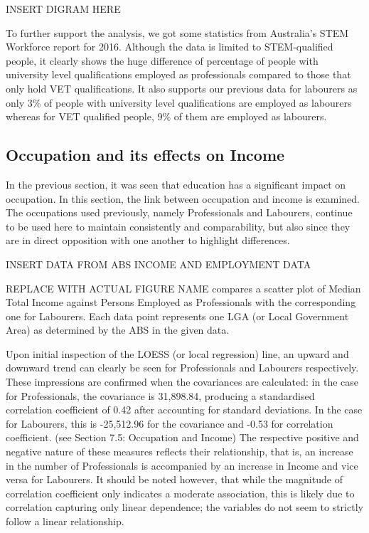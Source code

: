 \documentclass[12pt,a4paper]{article}
\begin{document}
	INSERT DIGRAM HERE
	
	To further support the analysis, we got some statistics from Australia’s STEM Workforce report for 2016. Although the data is limited to STEM-qualified people, it clearly shows the huge difference of percentage of people with university level qualifications employed as professionals compared to those that only hold VET qualifications. It also supports our previous data for labourers as only 3\% of people with university level qualifications are employed as labourers whereas for VET qualified people, 9\% of them are employed as labourers.
	
	
	\subsection{Occupation and its effects on Income}
	In the previous section, it was seen that education has a significant impact on occupation. In this section, the link between occupation and income is examined. The occupations used previously, namely Professionals and Labourers, continue to be used here to maintain consistently and comparability, but also since they are in direct opposition with one another to highlight differences.
	
	INSERT DATA FROM ABS INCOME AND EMPLOYMENT DATA
	
	REPLACE WITH ACTUAL FIGURE NAME compares a scatter plot of Median Total Income against Persons Employed as Professionals with the corresponding one for Labourers. Each data point represents one LGA (or Local Government Area) as determined by the ABS in the given data.
	
	Upon initial inspection of the LOESS (or local regression) line, an upward and downward trend can clearly be seen for Professionals and Labourers respectively. These impressions are confirmed when the covariances are calculated: in the case for Professionals, the covariance is 31,898.84, producing a standardised correlation coefficient of 0.42 after accounting for standard deviations. In the case for Labourers, this is -25,512.96 for the covariance and -0.53 for correlation coefficient. (see Section 7.5: Occupation and Income) The respective positive and negative nature of these measures reflects their relationship, that is, an increase in the number of Professionals is accompanied by an increase in Income and vice versa for Labourers. It should be noted however, that while the magnitude of correlation coefficient only indicates a moderate association, this is likely due to correlation capturing only linear dependence; the variables do not seem to strictly follow a linear relationship.
	
\end{document}

